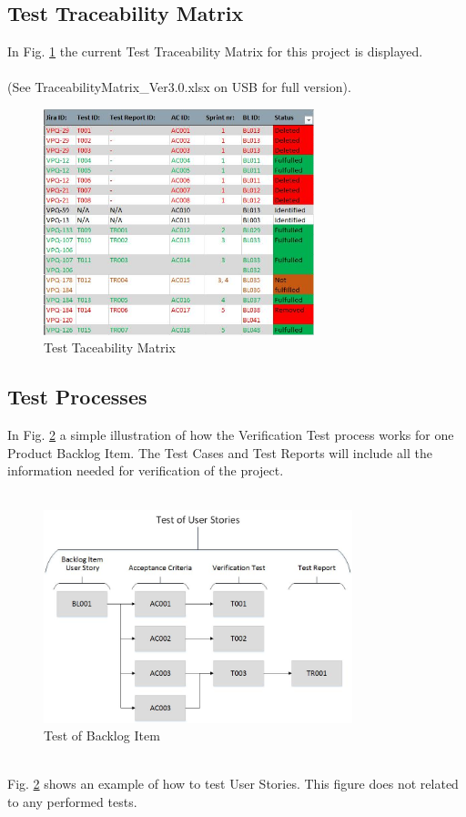 \subsection{Test Traceability Matrix}
In Fig. \ref{fig:Tmatrix} the current Test Traceability Matrix for this project is displayed.\\\\ (See TraceabilityMatrix\_Ver3.0.xlsx on USB for full version).

\begin{figure}[h]
    \centering
        \includegraphics[width=0.7\textwidth]{VAPIQ-PICTURES/Tmatrix}
        \caption{Test Taceability Matrix}
        \label{fig:Tmatrix}
\end{figure}

\newpage

\subsection{Test Processes}
In Fig. \ref{fig:testsetup} a simple illustration of how the Verification Test process works for one Product Backlog Item. The Test Cases and Test Reports will include all the information needed for verification of the project.\\
\\
\begin{figure}[h]
    \centering
        \includegraphics[width=0.8\textwidth]{VAPIQ-PICTURES/testdocbild}
        \caption{Test of Backlog Item}
        \label{fig:testsetup}
\end{figure}
\\
Fig. \ref{fig:testsetup} shows an example of how to test User Stories. This figure does not related to any performed tests.\\

